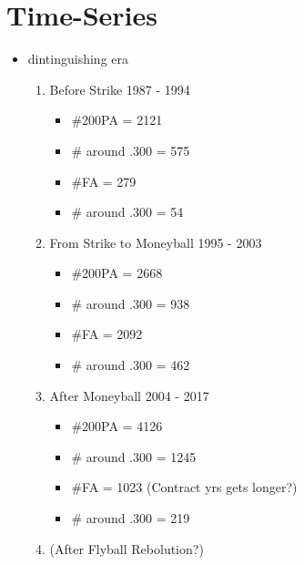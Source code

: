 \documentclass[dvipdfmx, 12pt]{article}
\begin{document}
\begin{landscape}
  \begin{table}
    

  \end{table}
\end{landscape}

\section{Time-Series}

\begin{itemize}
  \item dintinguishing era
  \begin{enumerate}
    \item Before Strike 1987 - 1994

    \begin{itemize}
      \item \#200PA = 2121

      \item \# around .300 = 575

      \item \#FA = 279

      \item \# around .300 = 54
    \end{itemize}

    \item From Strike to Moneyball 1995 - 2003

    \begin{itemize}
      \item \#200PA = 2668

      \item \# around .300 = 938

      \item \#FA = 2092

      \item \# around .300 = 462
    \end{itemize}

    \item After Moneyball 2004 - 2017

    \begin{itemize}
      \item \#200PA = 4126

      \item \# around .300 = 1245

      \item \#FA = 1023 (Contract yrs gets longer?)

      \item \# around .300 = 219

    \end{itemize}


    \item (After Flyball Rebolution?)
  \end{enumerate}
\end{itemize}
\end{document}
